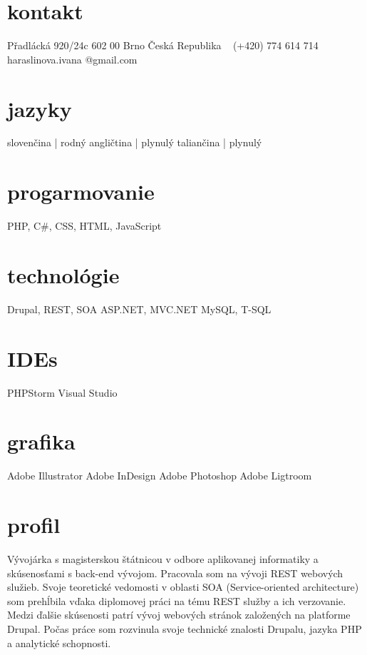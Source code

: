 \documentclass[]{friggeri-cv} %
\begin{document}


\begin{aside} %
\section{kontakt}
Přadlácká 920/24c
602 00 Brno
Česká Republika
~
(+420) 774 614 714
~
haraslinova.ivana
@gmail.com
\section{jazyky}
slovenčina | rodný
angličtina | plynulý
taliančina | plynulý
\section{progarmovanie}
PHP, C\#, CSS, HTML, JavaScript
\section{technológie}
Drupal,
REST, SOA
ASP.NET, MVC.NET
MySQL, T-SQL
\section{IDEs}
PHPStorm
Visual Studio
\section{grafika}
Adobe Illustrator
Adobe InDesign
Adobe Photoshop
Adobe Ligtroom
\end{aside}


\section{profil}

Vývojárka s magisterskou štátnicou v odbore aplikovanej informatiky a skúsenosťami s back-end vývojom. Pracovala som na vývoji REST webových služieb. Svoje teoretické vedomosti v oblasti SOA (Service-oriented architecture) som prehĺbila vďaka diplomovej práci na tému REST služby a ich verzovanie. Medzi ďalšie skúsenosti patrí vývoj webových stránok založených na platforme Drupal. Počas práce som rozvinula svoje technické znalosti Drupalu, jazyka PHP a analytické schopnosti.
\end{document}
